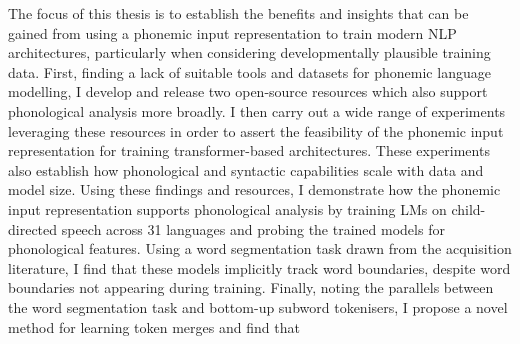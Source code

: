 



The focus of this thesis is to establish the benefits and insights that can be gained from using a phonemic input representation to train modern NLP architectures, particularly when considering developmentally plausible training data. First, finding a lack of suitable tools and datasets for phonemic language modelling, I develop and release two open-source resources which also support phonological analysis more broadly. I then carry out a wide range of experiments leveraging these resources in order to assert the feasibility of the phonemic input representation for training transformer-based architectures. These experiments also establish how phonological and syntactic capabilities scale with data and model size. Using these findings and resources, I demonstrate how the phonemic input representation supports phonological analysis by training LMs on child-directed speech across 31 languages and probing the trained models for phonological features. Using a word segmentation task drawn from the acquisition literature, I find that these models implicitly track word boundaries, despite word boundaries not appearing during training. Finally, noting the parallels between the word segmentation task and bottom-up subword tokenisers, I propose a novel method for learning token merges and find that \writemore


